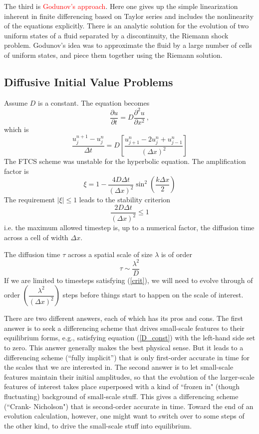\documentclass[12pt,a4paper]{article}
\begin{document}
The third is \textcolor{red}{Godunov's approach}. Here one gives up the simple linearization inherent in finite differencing based on Taylor series and includes the nonlinearity of the equations explicitly. There is an analytic solution for the evolution of two uniform states of a fluid separated by a discontinuity, the Riemann shock problem. Godunov's idea was to approximate the fluid by a large number of cells of uniform states, and piece them together using the Riemann solution.


\subsection{Diffusive Initial Value Problems}
Assume $D$ is a constant. The equation becomes
\begin{equation}
\frac{\partial u}{\partial t} = D \frac{\partial^2 u}{\partial x^2} ~,
\label{D_const}
\end{equation}
which is
\begin{equation}
\frac{u_j^{n+1} -u_j^{n}}{\Delta t} = D \left[\frac{u_{j+1}^{n} -2u_j^{n} +u_{j-1}^{n}}{(\Delta x)^2} \right]
\end{equation}
The FTCS scheme was unstable for the hyperbolic equation. The amplification factor is
\begin{equation}
\xi = 1-\frac{4D \Delta t}{(\Delta x)^2} \sin^2 \left(\frac{k \Delta x}{2} \right)
\end{equation}
The requirement $|\xi| \leqslant 1$ leads to the stability criterion
\begin{equation}
\frac{2D \Delta t}{(\Delta x)^2} \leqslant 1
\label{crit}
\end{equation}
i.e. the maximum allowed timestep is, up to a numerical factor, the diffusion time across a cell of width $\Delta x$.

The diffusion time $\tau$ across a spatial scale of size $\lambda$ is of order
\begin{equation}
\tau \sim \frac{\lambda^2 }{D}
\end{equation}
If we are limited to timesteps satisfying (\ref{crit}), we will need to evolve through of order $\left(\dfrac{\lambda^2}{(\Delta x)^2} \right)$ steps before things start to happen on the scale of interest.

There are two different answers, each of which has its pros and cons. The first answer is to seek a differencing scheme that drives small-scale features to their equilibrium forms, e.g., satisfying equation (\ref{D_const}) with the left-hand side set to zero. This answer generally makes the best physical sense. But it leads to a differencing scheme (“fully implicit”) that is only first-order accurate in time for the scales that we are interested in. The second answer is to let small-scale features maintain their initial amplitudes, so that the evolution of the larger-scale features of interest takes place superposed with a kind of ``frozen in" (though fluctuating) background of small-scale stuff. This gives a differencing scheme (``Crank- Nicholson") that is second-order accurate in time. Toward the end of an evolution calculation, however, one might want to switch over to some steps of the other kind, to drive the small-scale stuff into equilibrium. 
\end{document}
